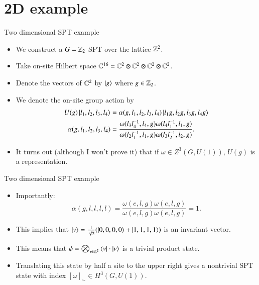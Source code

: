 \documentclass{beamer}
\begin{document}
\section{2D example}

\begin{frame}{Two dimensional SPT example}
	\begin{itemize}
		\item We construct a $G=\mathbb{Z}_2$ SPT over the lattice $\mathbb{Z}^2$.
		\item Take on-site Hilbert space $\mathbb{C}^{16}=\mathbb{C}^2\otimes\mathbb{C}^2\otimes\mathbb{C}^2\otimes\mathbb{C}^2$.
		\item Denote the vectors of $\mathbb{C}^2$ by $\ket{g}$ where $g\in\mathbb{Z}_2$.
		\item We denote the on-site group action by
		\begin{align}
			U(g)\ket{l_1,l_2,l_3,l_4}&=\alpha(g,l_1,l_2,l_3,l_4)\ket{l_1g,l_2g,l_3g,l_4g}\\
			\alpha(g,l_1,l_2,l_3,l_4)&=\frac{\omega(l_3l_4^{-1},l_4,g)\omega(l_4l_1^{-1},l_1,g)}{\omega(l_2l_1^{-1},l_1,g)\omega(l_3l_2^{-1},l_2,g)}.
		\end{align}
		\item It turns out (although I won't prove it) that if $\omega\in Z^3(G,U(1))$, $U(g)$ is a representation.
	\end{itemize}
\end{frame}

\begin{frame}{Two dimensional SPT example}
	\begin{itemize}
		\item Importantly:
		\[\alpha(g,l,l,l,l)=\frac{\omega(e,l,g)\omega(e,l,g)}{\omega(e,l,g)\omega(e,l,g)}=1.\]
		\item This implies that $\ket{v}=\frac{1}{\sqrt{2}}(\ket{0,0,0,0}+\ket{1,1,1,1})$ is an invariant vector.
		\item This means that $\phi=\bigotimes_{i\in\mathbb{Z}^2}\bra{v}\cdot \ket{v}$ is a trivial product state.
		\item Translating this state by half a site to the upper right gives a nontrivial SPT state with index $[\omega]_\sim\in H^3(G,U(1))$.
	\end{itemize}
\end{frame}
\end{document}
